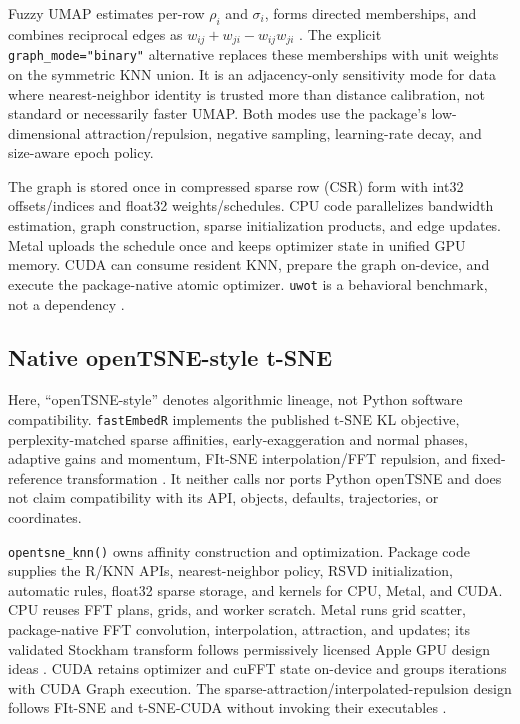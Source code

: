 \documentclass[twoside,11pt]{article}
\newcommand{\pkg}{\texttt{fastEmbedR}}
\begin{document}
Fuzzy UMAP estimates per-row $\rho_i$ and $\sigma_i$, forms directed memberships, and combines reciprocal edges as $w_{ij}+w_{ji}-w_{ij}w_{ji}$ \citep{mcinnes2018}. The explicit \texttt{graph\_mode="binary"} alternative replaces these memberships with unit weights on the symmetric KNN union. It is an adjacency-only sensitivity mode for data where nearest-neighbor identity is trusted more than distance calibration, not standard or necessarily faster UMAP. Both modes use the package's low-dimensional attraction/repulsion, negative sampling, learning-rate decay, and size-aware epoch policy.

The graph is stored once in compressed sparse row (CSR) form with int32 offsets/indices and float32 weights/schedules. CPU code parallelizes bandwidth estimation, graph construction, sparse initialization products, and edge updates. Metal uploads the schedule once and keeps optimizer state in unified GPU memory. CUDA can consume resident KNN, prepare the graph on-device, and execute the package-native atomic optimizer. \texttt{uwot} is a behavioral benchmark, not a dependency \citep{uwot}.

\subsection{Native openTSNE-style t-SNE}

Here, ``openTSNE-style'' denotes algorithmic lineage, not Python software compatibility. \pkg{} implements the published t-SNE KL objective, perplexity-matched sparse affinities, early-exaggeration and normal phases, adaptive gains and momentum, FIt-SNE interpolation/FFT repulsion, and fixed-reference transformation \citep{vandermaaten2008,linderman2019,policar2021,policar2024,belkina2019}. It neither calls nor ports Python openTSNE and does not claim compatibility with its API, objects, defaults, trajectories, or coordinates.

\texttt{opentsne\_knn()} owns affinity construction and optimization. Package code supplies the R/KNN APIs, nearest-neighbor policy, RSVD initialization, automatic rules, float32 sparse storage, and kernels for CPU, Metal, and CUDA. CPU reuses FFT plans, grids, and worker scratch. Metal runs grid scatter, package-native FFT convolution, interpolation, attraction, and updates; its validated Stockham transform follows permissively licensed Apple GPU design ideas \citep{applesiliconfft}. CUDA retains optimizer and cuFFT state on-device and groups iterations with CUDA Graph execution. The sparse-attraction/interpolated-repulsion design follows FIt-SNE and t-SNE-CUDA without invoking their executables \citep{linderman2019,chan2018}.
\end{document}
